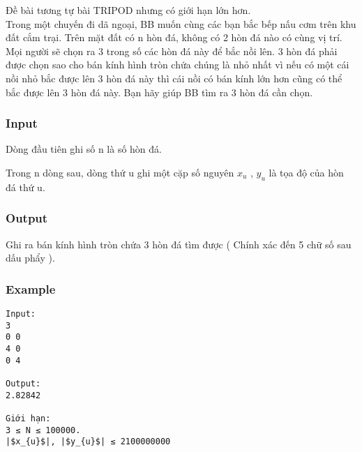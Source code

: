



   Đề bài tương tự bài TRIPOD nhưng có giới hạn lớn hơn.   
\\   Trong một chuyến đi dã ngoại, BB muốn cùng các bạn bắc bếp nấu cơm trên khu đất cắm trại. Trên mặt đất có n hòn đá, không có 2 hòn đá nào có cùng vị trí. Mọi người sẽ chọn ra 3 trong số các hòn đá này để bắc nồi lên. 3 hòn đá phải được chọn sao cho bán kính hình tròn chứa chúng là nhỏ nhất vì nếu có một cái nồi nhỏ bắc được lên 3 hòn đá này thì cái nồi có bán kính lớn hơn cũng có thể bắc được lên 3 hòn đá này. Bạn hãy giúp BB tìm ra 3 hòn đá cần chọn.  

\subsubsection{   Input  }

   Dòng đầu tiên ghi số n là số hòn đá.  

   Trong n dòng sau, dòng thứ u ghi một cặp số nguyên $x_{u}$   , $y_{u}$   là tọa độ của hòn đá thứ u.  

\subsubsection{   Output  }

   Ghi ra bán kính hình tròn chứa 3 hòn đá tìm được ( Chính xác đến 5 chữ số sau dấu phẩy ).  

\subsubsection{   Example  }
\begin{verbatim}
Input:
3
0 0
4 0
0 4

Output:
2.82842

Giới hạn:
3 ≤ N ≤ 100000. 
|$x_{u}$|, |$y_{u}$| ≤ 2100000000

\end{verbatim}
